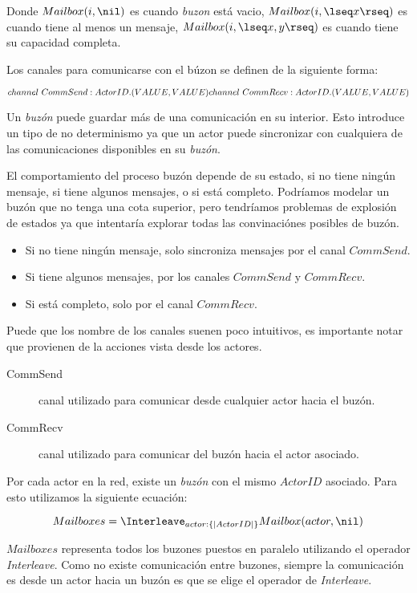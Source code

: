Donde $Mailbox(i, \nil)$ es cuando \textit{buzon} está vacio, $Mailbox(i, \lseq x \rseq)$ es cuando tiene al menos un mensaje, $Mailbox(i, \lseq x, y \rseq)$ es cuando tiene su capacidad completa.

Los canales para comunicarse con el búzon se definen de la siguiente forma:

\[
channel\ CommSend:ActorID.(VALUE, VALUE)\\
channel\ CommRecv:ActorID.(VALUE, VALUE)
\]

Un \textit{buzón} puede guardar más de una comunicación en su interior. Esto introduce un tipo de no determinismo ya que un actor puede sincronizar con cualquiera de las comunicaciones disponibles en su \textit{buzón}.

El comportamiento del proceso buzón depende de su estado, si no tiene ningún mensaje, si tiene algunos mensajes, o si está completo. Podríamos modelar un buzón que no tenga una cota superior, pero tendríamos problemas de explosión de estados ya que \FDR intentaría explorar todas las convinaciónes posibles de buzón.

\begin{itemize}
\item Si no tiene ningún mensaje, solo sincroniza mensajes por el canal $CommSend$.
\item Si tiene algunos mensajes, por los canales $CommSend$ y $CommRecv$.
\item Si está completo, solo por el canal $CommRecv$.
\end{itemize}

Puede que los nombre de los canales suenen poco intuitivos, es importante notar que provienen de la acciones vista desde los actores.

\begin{description}
\item [CommSend] canal utilizado para comunicar desde cualquier actor hacia el buzón.
\item [CommRecv] canal utilizado para comunicar del buzón hacia el actor asociado.
\end{description}

Por cada actor en la red, existe un \textit{buzón} con el mismo $ActorID$ asociado. Para esto utilizamos la siguiente ecuación:

\[
Mailboxes = \Interleave_{actor : \{| ActorID |\} } Mailbox(actor, \nil) 
\]

$Mailboxes$ representa todos los buzones puestos en paralelo utilizando el operador \textit{Interleave}. Como no existe comunicación entre buzones, siempre la comunicación es desde un actor hacia un buzón es que se elige el operador de \textit{Interleave}.

